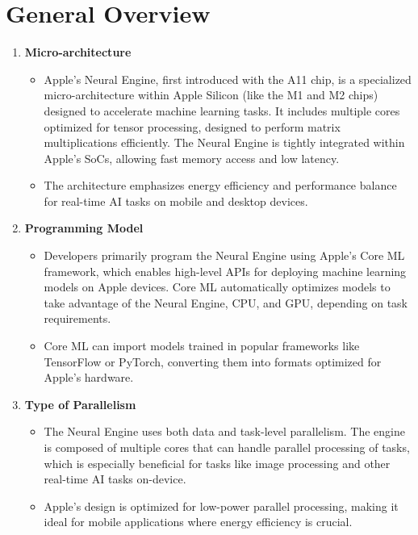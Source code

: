 \documentclass{article}
\begin{document}
\section{\textbf{General Overview}}
\begin{enumerate}[label=\textbf{\arabic*.}]
    \item \textbf{Micro-architecture}
    \begin{itemize}
        
            \item Apple's Neural Engine, first introduced with the A11 chip, is a specialized micro-architecture within Apple Silicon (like the M1 and M2 chips) designed to accelerate machine learning tasks. It includes multiple cores optimized for tensor processing, designed to perform matrix multiplications efficiently. The Neural Engine is tightly integrated within Apple's SoCs, allowing fast memory access and low latency.
            \item The architecture emphasizes energy efficiency and performance balance for real-time AI tasks on mobile and desktop devices.
       
    \end{itemize}

    \item \textbf{Programming Model}
    \begin{itemize}
        
            \item Developers primarily program the Neural Engine using Apple’s Core ML framework, which enables high-level APIs for deploying machine learning models on Apple devices. Core ML automatically optimizes models to take advantage of the Neural Engine, CPU, and GPU, depending on task requirements.
            \item Core ML can import models trained in popular frameworks like TensorFlow or PyTorch, converting them into formats optimized for Apple's hardware.
        
    \end{itemize}

    \item \textbf{Type of Parallelism}
    \begin{itemize}
            \item The Neural Engine uses both data and task-level parallelism. The engine is composed of multiple cores that can handle parallel processing of tasks, which is especially beneficial for tasks like image processing and other real-time AI tasks on-device.
            \item Apple's design is optimized for low-power parallel processing, making it ideal for mobile applications where energy efficiency is crucial.
    \end{itemize}


\end{enumerate}
\end{document}
